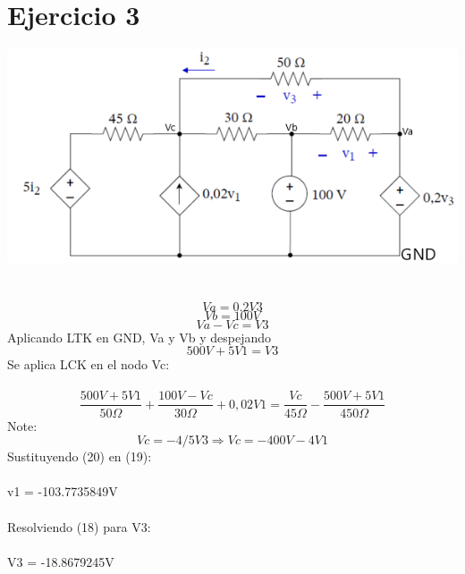 \documentclass{article}
\begin{document}
\section{Ejercicio 3}
\includegraphics[]{images/ejercicio3_2.PNG} \\ \\ \\
\begin{equation}
    Va = 0.2V3
\end{equation}
\begin{equation}
    Vb = 100V
\end{equation}
\begin{equation}
    Va - Vc = V3
\end{equation}
Aplicando LTK en GND, Va y Vb y despejando
\begin{equation}
    500V+5V1=V3 
\end{equation}
Se aplica LCK en el nodo Vc: \\ \\
\begin{equation}
    \frac{500V+5V1}{50\Omega} + \frac{100V-Vc}{30\Omega} + 0,02V1= \frac{Vc}{45\Omega} -\frac{500V + 5V1}{450\Omega} 
\end{equation}
Note: \\
\begin{equation}
    Vc = -4/5 V3 \Longrightarrow Vc = -400V -4V1
\end{equation}
Sustituyendo (20) en (19):\\ \\
v1 = -103.7735849V\\ \\
Resolviendo (18) para V3:\\ \\
V3 = -18.8679245V
\end{document}
